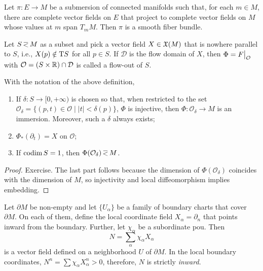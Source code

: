 \begin{cor}[Ehresmann (1961)]\label{thm Ehresmann vector fields}
    Let $\pi:E\to M$ be a submersion of connected manifolds such that, for each $m\in M$, there are complete vector fields on $E$ that project to complete vector fields on $M$ whose values at $m$ span $T_m M$. Then $\pi$ is a smooth fiber bundle.
\end{cor}



\begin{defn}
    Let $S\emb M$ as a subset and pick a vector field $X\in\mathfrak{X}(M)$ that is nowhere parallel to $S$, i.e., $X(p)\notin \mathrm{T} S$ for all $p\in S$. If $\mathcal{D}$ is the flow domain of $X$, then $\Phi=\restr{F}{\mathcal{O}}$ with $\mathcal{O}=(S\times\mathbb{R} )\cap \mathcal{D}$ is called a flow-out of $S$.
\end{defn}

\begin{thm}
    With the notation of the above definition,
    \begin{enumerate}
        \item If $\delta:S\to [0,+\infty)$ is chosen so that, when restricted to the set $\mathcal{O}_\delta=\{(p,t)\in\mathcal{O}\mid |t|<\delta(p)\}$, $\Phi$ is injective, then $\Phi:\mathcal{O}_\delta\to M$ is an immersion. Moreover, such a $\delta$ always exists;
        \item $\Phi_\ast (\partial_t)=X$ on $\mathcal{O}$;
        \item If $\operatorname{codim} S=1$, then $\Phi(\mathcal{O}_\delta)\emb M$.
    \end{enumerate}
\end{thm}
\begin{proof}
    Exercise. The last part follows because the dimension of $\Phi(\mathcal{O}_\delta)$ coincides with the dimension of $M$, so injectivity and local diffeomorphism implies embedding.
\end{proof}

Let $\partial M$ be non-empty and let $\{U_\alpha\}$ be a family of boundary charts that cover $\partial M$. On each of them, define the local coordinate field $X_\alpha=\partial_n$ that points inward from the boundary. Further, let $\chi_\alpha$ be a subordinate \gls{pou}. Then 
\[N=\sum_\alpha \chi_\alpha X_\alpha\]
is a vector field defined on a neighborhood $U$ of $\partial M$. In the local boundary coordinates, $N^n=\sum \chi_\alpha X_\alpha^n>0$, therefore, $N$ is strictly \emph{inward}.

